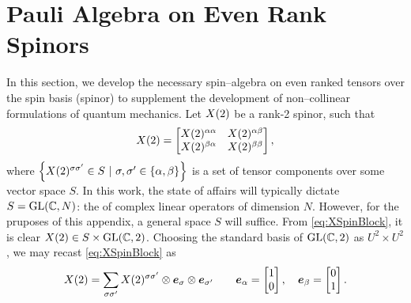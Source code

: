 \chapter{Pauli Algebra on Even Rank Spinors}
\label{apx:SpinorOp}

In this section, we develop the necessary spin--algebra on even ranked tensors over the spin basis (spinor) to supplement the development 
of non--collinear formulations of quantum mechanics.
Let $\spinor{2}{X}$ be a rank-2 spinor, such that
\begin{equation}
\label{eq:XSpinBlock}
\spinor{2}{X} = 
  \begin{bmatrix}
    \spinor{2}{X}^{\alpha\alpha} & \spinor{2}{X}^{\alpha\beta} \\
    \spinor{2}{X}^{\beta\alpha}  & \spinor{2}{X}^{\beta\beta} \\
  \end{bmatrix}, 
\end{equation}
where $\left\lbrace\spinor{2}{X}^{\sigma\sigma'} \in S
\text{ }\vert\text{ } \sigma,\sigma' \in \{\alpha,\beta\} \right\rbrace$ is a
set of tensor components over some vector space $S$. In this work, the state of affairs will
typically dictate $S = \GL{C}{N}$: the  of complex linear operators of dimension $N$. However, 
for the pruposes of this appendix, a general space $S$ will suffice. From \cref{eq:XSpinBlock}, 
it is clear $\spinor{2}{X} \in S \times \GL{C}{2}$.
Choosing the standard basis of $\GL{C}{2}$ as $U^2 \times U^2$,
we may recast \cref{eq:XSpinBlock} as
\begin{equation}
\label{eq:XSpinComp}
  \spinor{2}{X} = \sum_{\sigma\sigma'} \spinor{2}{X}^{\sigma\sigma'} \otimes \vc{e}_\sigma \otimes \vc{e}_{\sigma'} 
  \qquad 
  \vc{e}_\alpha = \begin{bmatrix} 1 \\ 0 \end{bmatrix}, \quad 
  \vc{e}_\beta  = \begin{bmatrix} 0 \\ 1 \end{bmatrix}.
\end{equation}

